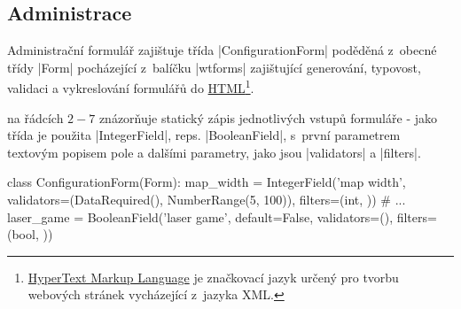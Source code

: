 \subsection{Administrace}
\label{subsec:administration}

\begin{sloppypar}
    Administrační formulář zajištuje třída \ic|ConfigurationForm| poděděná z~obecné třídy \ic|Form| pocházející z~balíčku \ic|wtforms| zajištující generování, typovost, validaci a vykreslování formulářů do \href{https://cs.wikipedia.org/wiki/HyperText_Markup_Language}{HTML}\footnote{\href{https://cs.wikipedia.org/wiki/HyperText_Markup_Language}{HyperText Markup Language} je značkovací jazyk určený pro tvorbu webových stránek vycházející z~jazyka XML.}.

     na řádcích $2-7$ znázorňuje statický zápis jednotlivých vstupů formuláře - jako třída je použita \ic|IntegerField|, reps. \ic|BooleanField|, s~první parametrem textovým popisem pole a dalšími parametry, jako jsou \ic|validators| a \ic|filters|.
\end{sloppypar}

\begin{code}[caption={Ukázka deklarace polí konfiguračního formuláře},label={lst:conf-form-fields}]
class ConfigurationForm(Form):
    map_width = IntegerField('map width',
        validators=(DataRequired(), NumberRange(5, 100)),
        filters=(int, ))
    # ...
    laser_game = BooleanField('laser game',
        default=False, validators=(),
        filters=(bool, ))
\end{code}

